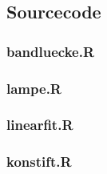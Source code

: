 \documentclass[12pt]{article}
\newcommand{\gra}[3][0.7]{
	\begin{minipage}[h!]{\textwidth}
		\centering
		\texttt{[image: figures/\#2.png]}
		\captionof{figure}{#3}
	\end{minipage}
	\vskip 30 pt
	}
\begin{document}
\subsection{Sourcecode}
\subsubsection{bandluecke.R}\label{srcbandluecke}

\subsubsection{lampe.R}\label{srclampe}

\subsubsection{linearfit.R}\label{srclinearfit}

\subsubsection{konstift.R}\label{srckonstfit}





%


%



\newpage
\listoffigures

\end{document}
